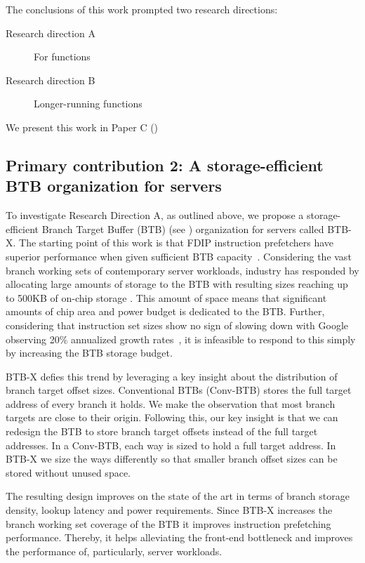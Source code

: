 \documentclass[../main.tex]{subfiles}
\begin{document}
\begin{refsection}
The conclusions of this work prompted two research directions:
 \begin{description}
 \item[Research direction A] For functions
 \item[Research direction B] Longer-running functions 
 \end{description}



 
We present this work in Paper C ()


\subsection{Primary contribution 2: A storage-efficient BTB organization for servers}
To investigate Research Direction A, as outlined above, we propose a storage-efficient Branch Target Buffer (BTB) (see ) organization for servers called BTB-X.  The starting point of this work is that FDIP instruction prefetchers have superior performance when given sufficient BTB capacity~\cite{ishii21_re_fetch_direc_instr_prefet}. Considering the vast branch working sets of contemporary server workloads, industry has responded by allocating large amounts of storage to the BTB \cite{neoverse,IBMz,zen2} with resulting sizes reaching up to 500KB of on-chip storage \cite{exynos}. This amount of space means that significant amounts of chip area and power budget is dedicated to the BTB. Further, considering that instruction set sizes show no sign of slowing down with Google observing 20\% annualized growth rates~\cite{kanev15_profil}, it is infeasible to respond to this simply by increasing the BTB storage budget.

BTB-X defies this trend by leveraging a key insight about the distribution of branch target offset sizes. Conventional BTBs (Conv-BTB) stores the full target address of every branch it holds. We make the observation that most branch targets are close to their origin. Following this, our key insight is that we can redesign the BTB to store branch target offsets instead of the full target addresses. In a Conv-BTB, each way is sized to hold a full target address. In BTB-X we size the ways differently so that smaller branch offset sizes can be stored without unused space.

The resulting design improves on the state of the art in terms of branch storage density, lookup latency and power requirements. Since BTB-X increases the branch working set coverage of the BTB it improves  instruction prefetching performance. Thereby, it helps alleviating the front-end bottleneck and improves the performance of, particularly, server workloads.


\end{refsection}
\end{document}

